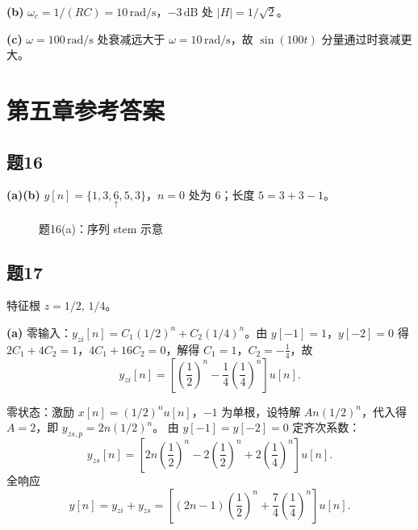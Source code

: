 \documentclass[11pt,a4paper]{ctexart}
\begin{document}
\textbf{(b)} $\omega_c=1/(RC)=10\,\mathrm{rad/s}$，$-3\,\mathrm{dB}$ 处 $|H|=1/\sqrt{2}$。

\textbf{(c)} $\omega=100\,\mathrm{rad/s}$ 处衰减远大于 $\omega=10\,\mathrm{rad/s}$，故 $\sin(100t)$ 分量通过时衰减更大。

\section{第五章参考答案}

\subsection*{题16}

\textbf{(a)(b)} $y[n]=\{1,3,\underset{\uparrow}{6},5,3\}$，$n=0$ 处为 $6$；长度 $5=3+3-1$。

\begin{figure}[htbp]
\centering
{}
\caption{题16(a)：序列 stem 示意}
\end{figure}

\subsection*{题17}

特征根 $z=1/2,\,1/4$。

\textbf{(a)} 零输入：$y_{zi}[n]=C_1(1/2)^n+C_2(1/4)^n$。由 $y[-1]=1$，$y[-2]=0$ 得
$2C_1+4C_2=1$，$4C_1+16C_2=0$，解得 $C_1=1$，$C_2=-\frac{1}{4}$，故
\[
y_{zi}[n]=\left[\left(\frac{1}{2}\right)^n-\frac{1}{4}\left(\frac{1}{4}\right)^n\right]u[n].
\]

零状态：激励 $x[n]=(1/2)^n u[n]$，$-1$ 为单根，设特解 $An(1/2)^n$，代入得 $A=2$，即 $y_{zs,p}=2n(1/2)^n$。
由 $y[-1]=y[-2]=0$ 定齐次系数：
\[
y_{zs}[n]=\left[2n\left(\frac{1}{2}\right)^n-2\left(\frac{1}{2}\right)^n+2\left(\frac{1}{4}\right)^n\right]u[n].
\]
全响应
\[
y[n]=y_{zi}+y_{zs}=\left[(2n-1)\left(\frac{1}{2}\right)^n+\frac{7}{4}\left(\frac{1}{4}\right)^n\right]u[n].
\]
\end{document}
